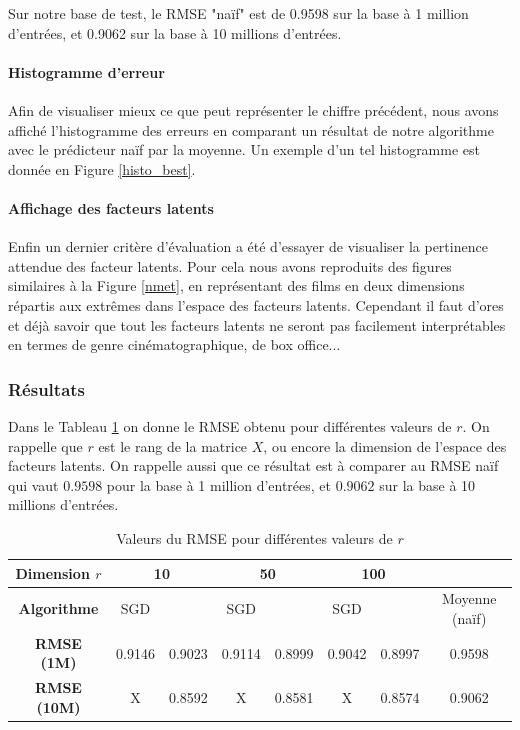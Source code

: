 \documentclass[10pt,a4paper]{article}
\begin{document}
 Sur notre base de test, le RMSE "naïf" est de 0.9598 sur la base à 1 million d'entrées, et 0.9062 sur la base à 10 millions d'entrées.

\paragraph{Histogramme d'erreur} Afin de visualiser mieux ce que peut représenter le chiffre précédent, nous avons affiché l'histogramme des erreurs en comparant un résultat de notre algorithme avec le prédicteur naïf par la moyenne. Un exemple d'un tel histogramme est donnée en Figure \ref{histo_best}.

\paragraph{Affichage des facteurs latents}

Enfin un dernier critère d'évaluation a été d'essayer de visualiser la pertinence attendue des facteur latents. Pour cela nous avons reproduits des figures similaires à la Figure \ref{nmet}, en représentant des films en deux dimensions répartis aux extrêmes dans l'espace des facteurs latents. Cependant il faut d'ores et déjà savoir que tout les facteurs latents ne seront pas facilement interprétables en termes de genre cinématographique, de box office...

\subsubsection*{Résultats}

Dans le Tableau \ref{RMSE_vs_r} on donne le RMSE obtenu pour différentes valeurs de $r$. On rappelle que $r$ est le rang de la matrice $X$, ou encore la dimension de l'espace des facteurs latents. On rappelle aussi que ce résultat est à comparer au RMSE naïf qui vaut $0.9598$ pour la base à 1 million d'entrées, et $0.9062$ sur la base à 10 millions d'entrées.

\begin{table}[h]
\begin{center}
   \begin{tabular}{|c|c|c|c|c|c|c|c|}
  	\hline
  	\textbf{Dimension $r$} & \multicolumn{2}{c|}{10} & \multicolumn{2}{c|}{50} & \multicolumn{2}{c|}{100}& \\
  	\hline
  	\textbf{Algorithme} & SGD & \jel & SGD & \jel & SGD & \jel & Moyenne (naïf) \\
  	\hline
  	\textbf{RMSE (1M)}  & 0.9146  & 0.9023 & 0.9114 & 0.8999 & 0.9042 & 0.8997 & 0.9598\\
  	\hline
  	\textbf{RMSE (10M)}  & X  & 0.8592 & X & 0.8581 & X & 0.8574 & 0.9062\\
  	\hline
\end{tabular}
\end{center}
\caption{\label{RMSE_vs_r} Valeurs du RMSE pour différentes valeurs de $r$}
\end{table}
\end{document}
